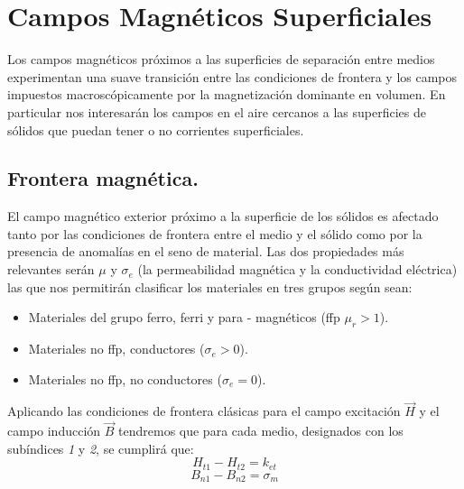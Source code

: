 
\chapter{Campos Magnéticos Superficiales} %

\label{AppendixCamposMagneticosSuperficiales} %

Los campos magnéticos próximos a las superficies de separación entre medios experimentan una suave transición entre las condiciones de frontera  y los campos impuestos macroscópicamente por la magnetización dominante en volumen. En particular nos interesarán los campos en el aire cercanos a las superficies de sólidos que puedan tener o no corrientes superficiales.


\section{Frontera magnética.}

El campo magnético exterior próximo a la superficie de los sólidos es afectado tanto por las condiciones de frontera entre el medio y el sólido como por la presencia de anomalías en el seno de material. Las dos propiedades más relevantes serán $\mu$ y $\sigma_{e}$ (la permeabilidad magnética y la conductividad eléctrica) las que nos permitirán clasificar los materiales en tres grupos según sean:

\begin{itemize}
	\item Materiales del grupo ferro, ferri y para - magnéticos (ffp $\mu_{r}>1$). 	
	\item Materiales no ffp, conductores ($\sigma_{e}>0$).
	\item Materiales no ffp, no conductores ($\sigma_{e}=0$).	
\end{itemize}


Aplicando las condiciones de frontera clásicas para el campo excitación $\vec{H}$ y el campo inducción $\vec{B}$ tendremos que para cada medio, designados con los subíndices \textit{1} y \textit{2}, se cumplirá que:
\begin{equation}
	\label{eq:mediosLIH1}
	H_{t1} - H_{t2} = k_{et}
\end{equation}
\begin{equation}
	\label{eq:mediosLIH2}
	B_{n1} - B_{n2} = \sigma_{m}
\end{equation}

